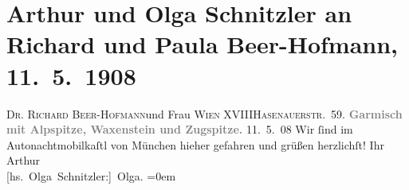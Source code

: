 

         
         \renewcommand{\erwaehntePersonen}{Personen: Richard Beer-Hofmann, Paula Beer-Hofmann, Olga Schnitzler}
         \renewcommand{\erwaehnteOrte}{Orte: Alpspitze, Garmisch-Partenkirchen, Hasenauerstraße, München, Waxenstein, Wien, XVIII., Währing, Zugspitze}
         \renewcommand{\erwaehnteWerke}{}
               \section[Arthur und Olga Schnitzler an Richard und Paula Beer-Hofmann, 11. 5. 1908]{ Arthur und Olga Schnitzler an Richard und Paula Beer-Hofmann,
               11. 5. 1908}\nopagebreak{}\rehead{ }\begin{ledgroupsized}[t]{13cm}\normalsize\beginnumbering \toendnotes[C]{\smallbreak\pagebreak[2]} 
\pstart{}{\pb}\textsc{Dr. Richard Beer-Hofmann}\pend{}\pstart{}und Frau \pend{}\pstart{}\textsc{Wien XVIII}\pend{}\pstart{}\textsc{Hasenauerstr. 59}.\pend{}{\bigskip}\pstart
           \noindent{}\centering{}{\pb}\textcolor{gray}{\textbf{Garmisch mit Alpspitze, Waxenstein und Zugspitze.}}\pend
           \pstart
           {\pb}11. 5. 08\pend
           \pstart
           Wir ſind im Autonachtmobilkaſtl von München
               hieher gefahren und grüßen herzlichſt!\pend
           \pstart
           Ihr{\\[\baselineskip]}\spacefill\mbox{Arthur}{\\[\baselineskip]}\spacefill\mbox{{[}hs. Olga Schnitzler:{]} Olga.}\pend
           \leftskip=0em{}
         
         \endnumbering{}\end{ledgroupsized}  \newcommand{\dateiname}{L01771}\newcommand{\titel}{Arthur und Olga Schnitzler an Richard und Paula Beer-Hofmann, 11. 5. 1908}\newcommand{\editorInnen}{Martin Anton Müller und Gerd-Hermann Susen}
      